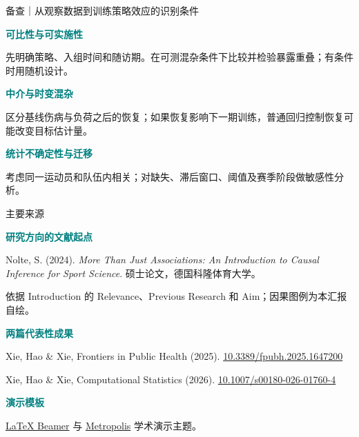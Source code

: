 \documentclass[aspectratio=169,10pt]{beamer}
\newcommand{\point}[2]{\par\textcolor{teal}{\textbf{#1}}\par #2\par\vspace{3pt}}
\newcommand{\paperone}{Xie, Hao \& Xie, Frontiers in Public Health (2025). \href{https://doi.org/10.3389/fpubh.2025.1647200}{10.3389/fpubh.2025.1647200}}
\newcommand{\papertwo}{Xie, Hao \& Xie, Computational Statistics (2026). \href{https://doi.org/10.1007/s00180-026-01760-4}{10.1007/s00180-026-01760-4}}
\newcommand{\nolte}{Nolte, S. (2024). \textit{More Than Just Associations: An Introduction to Causal Inference for Sport Science}. 硕士论文，德国科隆体育大学。}
\begin{document}
\begin{frame}{备查｜从观察数据到训练策略效应的识别条件}
\point{可比性与可实施性}{先明确策略、入组时间和随访期。在可测混杂条件下比较并检验暴露重叠；有条件时用随机设计。}
\point{中介与时变混杂}{区分基线伤病与负荷之后的恢复；如果恢复影响下一期训练，普通回归控制恢复可能改变目标估计量。}
\point{统计不确定性与迁移}{考虑同一运动员和队伍内相关；对缺失、滞后窗口、阈值及赛季阶段做敏感性分析。}
\end{frame}

\begin{frame}{主要来源}
\small
\point{研究方向的文献起点}{\nolte\par
依据 Introduction 的 Relevance、Previous Research 和 Aim；因果图例为本汇报自绘。}
\point{两篇代表性成果}{\paperone\par\papertwo}
\point{演示模板}{\href{https://github.com/josephwright/beamer}{LaTeX Beamer} 与 \href{https://github.com/matze/mtheme}{Metropolis} 学术演示主题。}
\end{frame}
\end{document}
